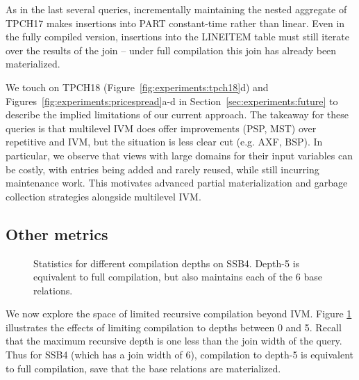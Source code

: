 
As in the last several queries, incrementally maintaining the nested aggregate of TPCH17 makes insertions into PART constant-time rather than linear.  Even in the fully compiled version, insertions into the LINEITEM table must still iterate over the results of the join -- under full compilation this join has already been materialized.

We touch on TPCH18 (Figure~\ref{fig:experiments:tpch18}d) and Figures~\ref{fig:experiments:pricespread}a-d in Section~\ref{sec:experiments:future} to describe the implied limitations of our current approach. The takeaway for these queries is that multilevel IVM does offer improvements (PSP, MST) over repetitive and IVM, but the situation is less clear cut (e.g. AXF, BSP). In particular, we observe that views with large domains for their input variables can be costly, with entries being added and rarely reused, while still incurring maintenance work. This motivates advanced partial materialization and garbage collection strategies alongside multilevel IVM.


\subsection{Other metrics}
\label{sec:experiments:othermetrics}

\begin{figure}
\begin{center}
\resizebox{3.4in}{!}{

}
\caption{Statistics for different compilation depths on SSB4.  Depth-5 is equivalent to full compilation, but also maintains each of the 6 base relations.}
\label{fig:experiments:ssb4depth}
\end{center}
\vspace*{-0.2in}
\end{figure}
We now explore the space of limited recursive compilation beyond IVM.  Figure \ref{fig:experiments:ssb4depth} illustrates the effects of limiting compilation to depths between 0 and 5.  Recall that the maximum recursive depth is one less than the join width of the query.  Thus for SSB4 (which has a join width of 6), compilation to depth-5 is equivalent to full compilation, save that the base relations are materialized.

